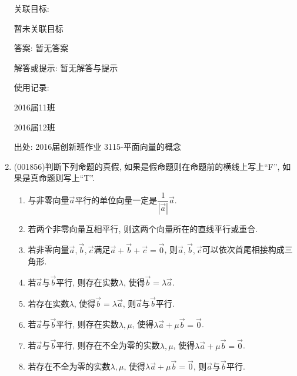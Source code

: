 \documentclass[10pt,a4paper]{article}
\newcommand{\blank}[1]{\underline{\hbox to #1pt{}}}
\begin{document}
\begin{enumerate}[1.]
关联目标:

暂未关联目标

答案: 暂无答案

解答或提示: 暂无解答与提示

使用记录:

2016届11班								

2016届12班								


出处: 2016届创新班作业	3115-平面向量的概念
\item { (001856)}判断下列命题的真假, 如果是假命题则在命题前的横线上写上``F'', 如果是真命题则写上``T''.\\ 
\begin{enumerate}[\blank{30}(1)]
\item 与非零向量$\overrightarrow{a}$平行的单位向量一定是$\dfrac{1}{|\overrightarrow{a}|}\overrightarrow{a}$.\\ 
\item 若两个非零向量互相平行, 则这两个向量所在的直线平行或重合.\\ 
\item 若非零向量$\overrightarrow{a},\overrightarrow{b},\overrightarrow{c}$满足$\overrightarrow{a}+\overrightarrow{b}+\overrightarrow{c}=\overrightarrow{0}$, 则$\overrightarrow{a},\overrightarrow{b},\overrightarrow{c}$可以依次首尾相接构成三角形.\\ 
\item 若$\overrightarrow{a}$与$\overrightarrow{b}$平行, 则存在实数$\lambda$, 使得$\overrightarrow{b}=\lambda\overrightarrow{a}$.\\ 
\item 若存在实数$\lambda$, 使得$\overrightarrow{b}=\lambda\overrightarrow{a}$, 则$\overrightarrow{a}$与$\overrightarrow{b}$平行.\\ 
\item 若$\overrightarrow{a}$与$\overrightarrow{b}$平行, 则存在实数$\lambda,\mu$, 使得$\lambda\overrightarrow{a}+\mu\overrightarrow{b}=\overrightarrow{0}$.\\ 
\item 若$\overrightarrow{a}$与$\overrightarrow{b}$平行, 则存在不全为零的实数$\lambda,\mu$, 使得$\lambda\overrightarrow{a}+\mu\overrightarrow{b}=\overrightarrow{0}$.\\ 
\item 若存在不全为零的实数$\lambda,\mu$, 使得$\lambda\overrightarrow{a}+\mu\overrightarrow{b}=\overrightarrow{0}$, 则$\overrightarrow{a}$与$\overrightarrow{b}$平行.\\ 
\end{enumerate}



\end{enumerate}
\end{document}

